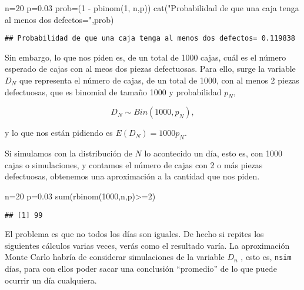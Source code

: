 \documentclass[
]{book}
\newenvironment{Shaded}{\begin{snugshade}}{\end{snugshade}}
\newcommand{\DecValTok}[1]{\textcolor[rgb]{0.00,0.00,0.81}{#1}}
\newcommand{\FloatTok}[1]{\textcolor[rgb]{0.00,0.00,0.81}{#1}}
\newcommand{\FunctionTok}[1]{\textcolor[rgb]{0.00,0.00,0.00}{#1}}
\newcommand{\NormalTok}[1]{#1}
\newcommand{\OtherTok}[1]{\textcolor[rgb]{0.56,0.35,0.01}{#1}}
\newcommand{\SpecialCharTok}[1]{\textcolor[rgb]{0.00,0.00,0.00}{#1}}
\newcommand{\StringTok}[1]{\textcolor[rgb]{0.31,0.60,0.02}{#1}}
\theoremstyle{definition}
\theoremstyle{definition}
\theoremstyle{definition}
\theoremstyle{definition}
\theoremstyle{remark}
\begin{document}
\begin{Shaded}
\begin{Highlighting}[]
\NormalTok{n}\OtherTok{=}\DecValTok{20}
\NormalTok{p}\OtherTok{=}\FloatTok{0.03}
\NormalTok{prob}\OtherTok{=}\NormalTok{(}\DecValTok{1} \SpecialCharTok{{-}} \FunctionTok{pbinom}\NormalTok{(}\DecValTok{1}\NormalTok{, n,p))}
\FunctionTok{cat}\NormalTok{(}\StringTok{"Probabilidad de que una caja tenga al menos dos defectos="}\NormalTok{,prob)}
\end{Highlighting}
\end{Shaded}

\begin{verbatim}
## Probabilidad de que una caja tenga al menos dos defectos= 0.119838
\end{verbatim}

Sin embargo, lo que nos piden es, de un total de 1000 cajas, cuál es el número esperado de cajas con al meos dos piezas defectuosas. Para ello, surge la variable \(D_N\) que representa el número de cajas, de un total de 1000, con al menos 2 piezas defectuosas, que es binomial de tamaño 1000 y probabilidad \(p_N\),

\[D_N \sim Bin(1000,p_N),\]

y lo que nos están pidiendo es \(E(D_N)=1000 p_N\).

Si simulamos con la distribución de \(N\) lo acontecido un día, esto es, con 1000 cajas o simulaciones, y contamos el número de cajas con 2 o más piezas defectuosas, obtenemos una aproximación a la cantidad que nos piden.

\begin{Shaded}
\begin{Highlighting}[]
\NormalTok{n}\OtherTok{=}\DecValTok{20}
\NormalTok{p}\OtherTok{=}\FloatTok{0.03}
\FunctionTok{sum}\NormalTok{(}\FunctionTok{rbinom}\NormalTok{(}\DecValTok{1000}\NormalTok{,n,p)}\SpecialCharTok{\textgreater{}=}\DecValTok{2}\NormalTok{)}
\end{Highlighting}
\end{Shaded}

\begin{verbatim}
## [1] 99
\end{verbatim}

El problema es que no todos los días son iguales. De hecho si repites los siguientes cálculos varias veces, verás como el resultado varía. La aproximación Monte Carlo habría de considerar simulaciones de la variable \(D_n\) , esto es, \texttt{nsim} días, para con ellos poder sacar una conclusión ``promedio'' de lo que puede ocurrir un día cualquiera.
\end{document}
